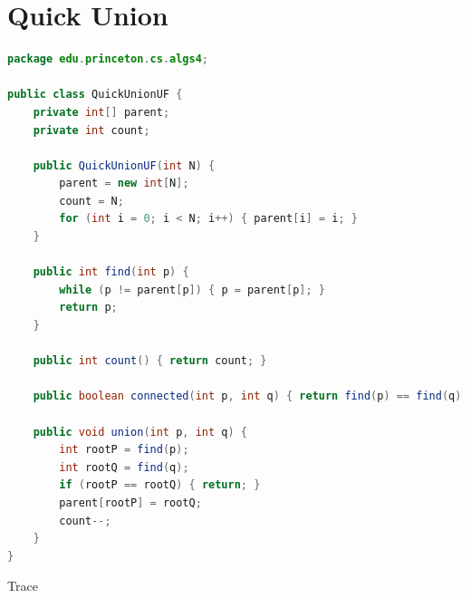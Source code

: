 \documentclass[8pt,a4paper,compress]{beamer}
\begin{document}
\section{Quick Union}
\begin{frame}[fragile]
\pause

\begin{lstlisting}[language=Java]
package edu.princeton.cs.algs4;

public class QuickUnionUF {
    private int[] parent;
    private int count;

    public QuickUnionUF(int N) {
        parent = new int[N];
        count = N;
        for (int i = 0; i < N; i++) { parent[i] = i; }
    }

    public int find(int p) {
        while (p != parent[p]) { p = parent[p]; }
        return p;
    }

    public int count() { return count; }
  
    public boolean connected(int p, int q) { return find(p) == find(q); }

    public void union(int p, int q) {
        int rootP = find(p);
        int rootQ = find(q);
        if (rootP == rootQ) { return; }
        parent[rootP] = rootQ; 
        count--;
    }
}
\end{lstlisting}
\end{frame}

\begin{frame}[fragile]
\pause

Trace

\begin{center}
\end{center}
\end{frame}
\end{document}
